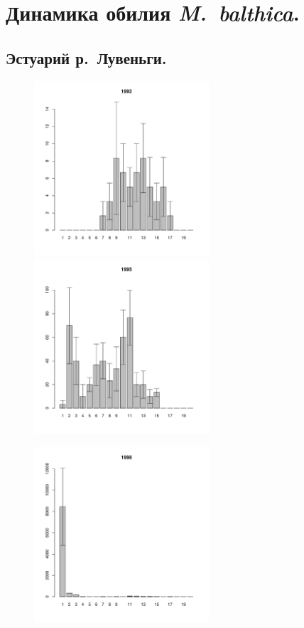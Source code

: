 \documentclass[12pt, a4paper]{article}
\begin{document}

\section{Динамика обилия {\it M.~balthica}.}
\subsection{Эстуарий р.~Лувеньги.}




\begin{figure}[h]

\begin{multicols}{3}
\hfill
\includegraphics[width=65mm]{../White_Sea/Estuatiy_Luvenga/sizestr_1992_.pdf}
\hfill
\includegraphics[width=65mm]{../White_Sea/Estuatiy_Luvenga/sizestr_1995_.pdf}

\hfill
\includegraphics[width=65mm]{../White_Sea/Estuatiy_Luvenga/sizestr_1998_.pdf}


\end{multicols}
\end{figure}
\end{document}
